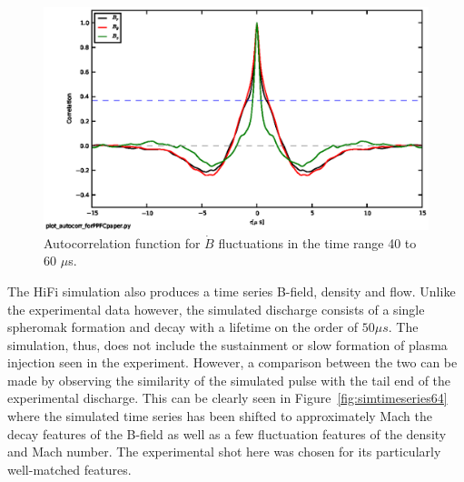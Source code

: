 \documentclass[12pt]{iopart}
\begin{document}
\begin{figure}[!htbp]
\centerline{
\includegraphics[width=16cm]{autocorr.eps}}
\caption{\label{fig:autocorr} Autocorrelation function for $\dot{B}$ fluctuations in the time range 40 to 60 $\mu$s.}
\end{figure}

The HiFi simulation also produces a time series B-field, density and flow. Unlike the experimental data however, the simulated discharge consists of a single spheromak formation and decay with a lifetime on the order of $50 \mu s$. The simulation, thus, does not include the sustainment or slow formation of plasma injection seen in the experiment. However, a comparison between the two can be made by observing the similarity of the simulated pulse with the tail end of the experimental discharge. This can be clearly seen in Figure~\ref{fig:simtimeseries64} where the simulated time series has been shifted to approximately Mach the decay features of the B-field as well as a few fluctuation features of the density and Mach number. The experimental shot here was chosen for its particularly well-matched features.
\end{document}
